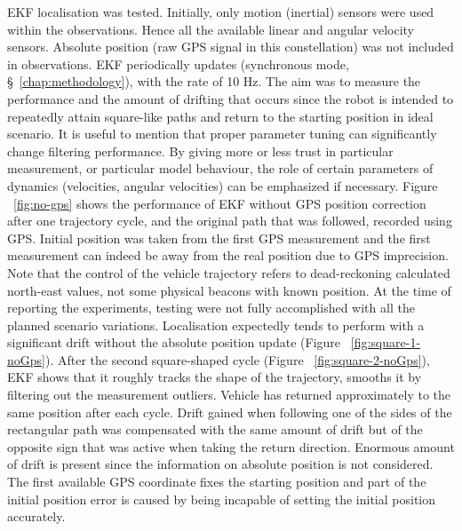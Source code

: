 EKF localisation was tested. Initially, only motion (inertial) sensors were used within the observations. Hence all the available linear and angular velocity sensors. Absolute position (raw GPS signal in this constellation) was not included in observations. EKF periodically updates (synchronous mode, \S~\ref{chap:methodology}), with the rate of 10 Hz. The aim was to measure the performance and the amount of drifting that occurs since the robot is intended to repeatedly attain square-like paths and return to the starting position in ideal scenario. It is useful to mention that proper parameter tuning can significantly change filtering performance. By giving more or less trust in particular measurement, or particular model behaviour, the role of certain parameters of dynamics (velocities, angular velocities) can be emphasized if necessary. Figure ~\ref{fig:no-gps} shows the performance of EKF without GPS position correction after one trajectory cycle, and the original path that was followed, recorded using GPS. Initial position was taken from the first GPS measurement and the first measurement can indeed be away from the real position due to GPS imprecision. Note that the control of the vehicle trajectory refers to dead-reckoning calculated north-east values, not some physical beacons with known position. At the time of reporting the experiments, testing were not fully accomplished with all the planned scenario variations. Localisation expectedly tends to perform with a significant drift without the absolute position update (Figure ~\ref{fig:square-1-noGps}). After the second square-shaped cycle (Figure ~\ref{fig:square-2-noGps}), EKF shows that it roughly tracks the shape of the trajectory, smooths it by filtering out the measurement outliers. Vehicle has returned approximately to the same position after each cycle. Drift gained when following one of the sides of the rectangular path was compensated with the same amount of drift but of the opposite sign that was active when taking the return direction. Enormous amount of drift is present since the information on absolute position is not considered. The first available GPS coordinate fixes the starting position and part of the initial position error is caused by being incapable of setting the initial position accurately.       
